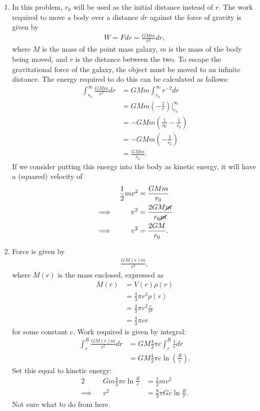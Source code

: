 \documentclass[11pt,letterpaper]{article}
\begin{document}
\begin{enumerate}[label=(\alph*)]
    \item In this problem, $r_0$ will be used as the initial distance instead of $r$. The work required to move a body over a distance $dr$ against the force of gravity is given by 
        \begin{align*}
            W = Fdr = \frac{GMm}{r^2}dr,
        \end{align*}
        where $M$ is the mass of the point mass galaxy, $m$ is the mass of the body being moved, and $r$ is the distance between the two. To escape the gravitational force of the galaxy, the object must be moved to an infinite distance. The energy required to do this can be calculated as follows:
        \begin{align*}
            \int_{r_0}^{\infty} \frac{GMm}{r^2}dr &= GMm \int_{r_0}^{\infty} r^{-2}dr \\
            &= GMm\left(-\frac{1}{r}\right)\Big|_{r_0}^{\infty} \\
            &= -GMm\left(\frac{1}{\infty} - \frac{1}{r_0}\right) \\
            &= -GMm\left(-\frac{1}{r_0}\right) \\
            &= \frac{GMm}{r_0}.
        \end{align*}
        If we consider putting this energy into the body as kinetic energy, it will have a (squared) velocity of 
        \begin{alignat*}{2}
            &&\frac{1}{2}mv^2 &= \frac{GMm}{r_0} \\
            \implies&&v^2 &= \frac{2GM\cancel{m}}{r_0\cancel{m}} \\
            \implies&&v^2 &= \frac{2GM}{r_0}.
        \end{alignat*}

    \item Force is given by 
        \begin{align*}
            \frac{GM(r)m}{r^2},
        \end{align*}
        where $M(r)$ is the mass enclosed, expressed as 
        \begin{align*}
            M(r) &= V(r)\rho(r) \\
            &= \frac{4}{3}\pi r^3 \rho(r) \\
            &= \frac{4}{3}\pi r^3 \frac{c}{r^2} \\
            &= \frac{4}{3}\pi cr
        \end{align*}
        for some constant $c$. Work required is given by integral:
        \begin{align*}
            \int_r^R \frac{GM(r)m}{r^2}dr &= GM\frac{4}{3}\pi c\int_r^R \frac{1}{r}dr \\
            &= GM\frac{4}{3}\pi c \ln(\frac{R}{r}).
        \end{align*}
        Set this equal to kinetic energy:
        \begin{alignat*}{2}
            &&Gm\frac{4}{3}\pi c\ln{\frac{R}{r}} &= \frac{1}{2}mv^2 \\
            \implies&&v^2 &= \frac{8}{3}\pi Gc\ln{\frac{R}{r}}.
        \end{alignat*}
        Not sure what to do from here. 


\end{enumerate}
\end{document}

